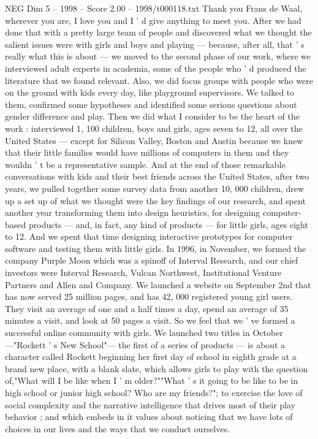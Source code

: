 \begin{textsample}{NEG Dim 5 – 1998 – Score 2.00 – 1998/t000118.txt}
Thank you Frans de Waal, wherever you are, I love you and I ' d give anything to meet you.
After we had done that with a pretty large team of people and discovered what we thought the salient issues were with girls and boys and playing — because, after all, that ' s really what this is about — we moved to the second phase of our work, where we interviewed adult experts in academia, some of the people who ' d produced the literature that we found relevant.
Also, we did focus groups with people who were on the ground with kids every day, like playground supervisors.
We talked to them, confirmed some hypotheses and identified some serious questions about gender difference and play.
Then we did what I consider to be the heart of the work : interviewed 1, 100 children, boys and girls, ages seven to 12, all over the United States — except for Silicon Valley, Boston and Austin because we knew that their little families would have millions of computers in them and they wouldn ' t be a representative sample.
And at the end of those remarkable conversations with kids and their best friends across the United States, after two years, we pulled together some survey data from another 10, 000 children, drew up a set up of what we thought were the key findings of our research, and spent another year transforming them into design heuristics, for designing computer-based products — and, in fact, any kind of products — for little girls, ages eight to 12.
And we spent that time designing interactive prototypes for computer software and testing them with little girls.
In 1996, in November, we formed the company Purple Moon which was a spinoff of Interval Research, and our chief investors were Interval Research, Vulcan Northwest, Institutional Venture Partners and Allen and Company.
We launched a website on September 2nd that has now served 25 million pages, and has 42, 000 registered young girl users.
They visit an average of one and a half times a day, spend an average of 35 minutes a visit, and look at 50 pages a visit.
So we feel that we ' ve formed a successful online community with girls.
We launched two titles in October —"Rockett ' s New School"— the first of a series of products — is about a character called Rockett beginning her first day of school in eighth grade at a brand new place, with a blank slate, which allows girls to play with the question of,"What will I be like when I ' m older?""What ' s it going to be like to be in high school or junior high school?
Who are my friends?"; to exercise the love of social complexity and the narrative intelligence that drives most of their play behavior ; and which embeds in it values about noticing that we have lots of choices in our lives and the ways that we conduct ourselves.

\end{textsample}
